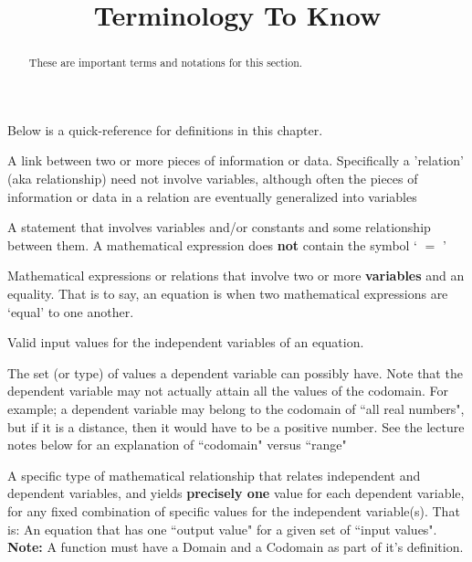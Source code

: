 \documentclass{ximera}
\title{Terminology To Know}
\begin{document}
\begin{abstract}
    These are important terms and notations for this section.
\end{abstract}
\maketitle

Below is a quick-reference for definitions in this chapter.

\begin{definition}
    A link between two or more pieces of information or data. Specifically a 'relation' (aka relationship) need not involve variables, although often the pieces of information or data in a relation are eventually generalized into variables
\end{definition}
    
\begin{definition}
    A statement that involves variables and/or constants and some relationship between them. A mathematical expression does \textbf{not} contain the symbol ` $=$ '
\end{definition}

\begin{definition}[Equation]
Mathematical expressions or relations that involve two or more \textbf{variables} and an equality. That is to say, an equation is when two mathematical expressions are `equal' to one another.
\end{definition}

\begin{definition}[Domain]
    Valid input values for the independent variables of an equation.
\end{definition}

\begin{definition}[Codomain]
    The set (or type) of values a dependent variable can possibly have. Note that the dependent variable may not actually attain all the values of the codomain.
    For example; a dependent variable may belong to the codomain of ``all real numbers", but if it is a distance, then it would have to be a positive number. See the lecture notes below for an explanation of ``codomain" versus ``range"
\end{definition}

\begin{definition}[Function]
    A specific type of mathematical relationship that relates independent and dependent variables, and yields \textbf{precisely one} value for each dependent variable, for any fixed combination of specific values for the independent variable(s). That is: An equation that has one ``output value" for a given set of ``input values".
    \textbf{Note:} A function must have a Domain and a Codomain as part of it's definition.
\end{definition}
\end{document}
